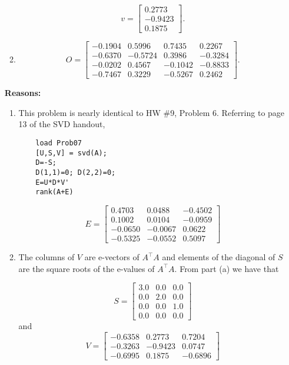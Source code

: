 \documentclass[letterpaper]{article}
\begin{document}
\begin{enumerate}
\begin{enumerate}
$$v=\left[ \begin{array}{r}0.2773\\-0.9423\\0.1875\end{array} \right].$$

\item
    $$O= \left[ \begin{array}{rrrr}-0.1904& 0.5996& 0.7435& 0.2267\\-0.6370& -0.5724& 0.3986& -0.3284\\-0.0202& 0.4567& -0.1042& -0.8833\\-0.7467& 0.3229& -0.5267& 0.2462\end{array} \right].$$
\end{enumerate}

\textbf{Reasons:}
\begin{enumerate}
\setlength{\itemsep}{.1in}
\renewcommand{\labelenumi}{(\alph{enumi})}

\item This problem is nearly identical to HW \#9, Problem 6. Referring to page 13 of the SVD handout,
\begin{verbatim}
    load Prob07
    [U,S,V] = svd(A);
    D=-S;
    D(1,1)=0; D(2,2)=0;
    E=U*D*V'
    rank(A+E)
\end{verbatim}

$$E=\left[ \begin{array}{rrr}0.4703& 0.0488& -0.4502\\0.1002& 0.0104& -0.0959\\-0.0650& -0.0067& 0.0622\\-0.5325& -0.0552& 0.5097\end{array} \right]
$$

\item The columns of $V$ are e-vectors of $A^\top A$ and elements of the diagonal of $S$ are the square roots of the e-values of $A^\top A$. From part (a) we have that

    $$S=\left[ \begin{array}{rrr}   3.0&    0.0&   0.0\\   0.0&   2.0&    0.0\\   0.0&   0.0&   1.0\\   0.0&    0.0&    0.0\end{array} \right]
$$
and
$$V=\left[ \begin{array}{rrr}-0.6358& 0.2773& 0.7204\\-0.3263& -0.9423& 0.0747\\-0.6995& 0.1875& -0.6896\end{array} \right]
$$


\end{enumerate}
\end{enumerate}
\end{document}
